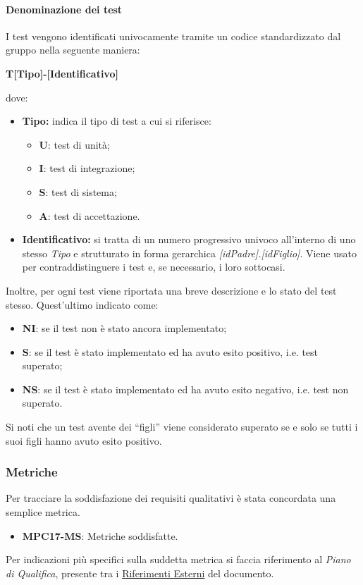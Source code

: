 \paragraph{Denominazione dei test}\label{sec:processi_di_supporto:accertamento_qualità:test}
I test vengono identificati univocamente tramite un codice standardizzato dal gruppo nella seguente maniera:
\begin{center}
    \textbf{T[Tipo]-[Identificativo]}
\end{center}
dove:
\begin{itemize}
    \item \textbf{Tipo:} indica il tipo di test a cui si riferisce:
        \begin{itemize}
            \item \textbf{U}: test di unità;
            \item \textbf{I}: test di integrazione;
            \item \textbf{S}: test di sistema;
            \item \textbf{A}: test di accettazione.
        \end{itemize}                 
    \item \textbf{Identificativo:} si tratta di un numero progressivo univoco all'interno di uno stesso \textit{Tipo} e strutturato in forma gerarchica \textit{[idPadre].[idFiglio]}. Viene usato per contraddistinguere i test e, se necessario, i loro sottocasi.
\end{itemize}
Inoltre, per ogni test viene riportata una breve descrizione e lo stato del test stesso. Quest'ultimo indicato come:
\begin{itemize}
    \item \textbf{NI}: se il test non è stato ancora implementato;
    \item \textbf{S}: se il test è stato implementato ed ha avuto esito positivo, i.e. test superato;
    \item \textbf{NS}: se il test è stato implementato ed ha avuto esito negativo, i.e. test non superato.
\end{itemize}
Si noti che un test avente dei ``figli'' viene considerato superato se e solo se tutti i suoi figli hanno avuto esito positivo.

\subsubsection{Metriche}\label{sec:processi_di_supporto:accertamento_qualità:metriche}
Per tracciare la soddisfazione dei requisiti qualitativi è stata concordata una semplice metrica.
\begin{itemize}
    \item \textbf{MPC17-MS}: Metriche soddisfatte.
\end{itemize}
Per indicazioni più specifici sulla suddetta metrica si faccia riferimento al \textit{Piano di Qualifica}, presente tra i \hyperref[sec:riferimenti_esterni]{Riferimenti Esterni} del documento.


